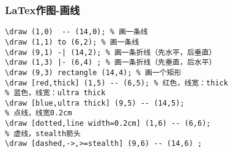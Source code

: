 \begin{frame}[fragile]
\frametitle{LaTex作图-画线}

\begin{verbatim}
\draw (1,0)  -- (14,0); % 画一条线
\draw (1,1) to (6,2); % 画一条线
\draw (9,1) -| (14,2); % 画一条折线（先水平，后垂直）
\draw (1,3) |- (6,4) ; % 画一条折线（先垂直，后水平）
\draw (9,3) rectangle (14,4); % 画一个矩形
\draw [red,thick] (1,5) -- (6,5); % 红色，线宽：thick
% 蓝色，线宽：ultra thick
\draw [blue,ultra thick] (9,5) -- (14,5); 
% 点线，线宽0.2cm
\draw [dotted,line width=0.2cm] (1,6) -- (6,6); 
% 虚线，stealth箭头
\draw [dashed,->,>=stealth] (9,6) -- (14,6) ; 
\end{verbatim}
\end{frame}